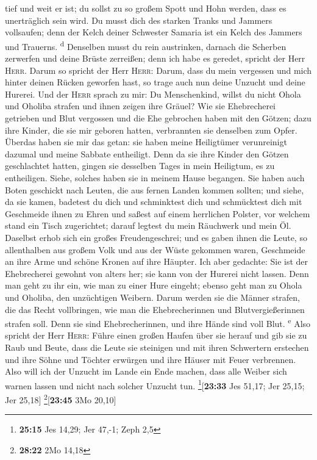 tief und weit er ist; du sollst zu so großem Spott und Hohn werden, dass
es unerträglich sein wird.  Du musst dich des starken
Tranks und Jammers vollsaufen; denn der Kelch deiner Schwester Samaria
ist ein Kelch des Jammers und Trauerns. \textsuperscript{d}
 Denselben musst du rein austrinken, darnach die Scherben
zerwerfen und deine Brüste zerreißen; denn ich habe es geredet, spricht
der Herr \textsc{Herr}.  Darum so spricht der Herr
\textsc{Herr}: Darum, dass du mein vergessen und mich hinter deinen
Rücken geworfen hast, so trage auch nun deine Unzucht und deine Hurerei.
 Und der \textsc{Herr} sprach zu mir: Du Menschenkind,
willst du nicht Ohola und Oholiba strafen und ihnen zeigen ihre Gräuel?
 Wie sie Ehebrecherei getrieben und Blut vergossen und
die Ehe gebrochen haben mit den Götzen; dazu ihre Kinder, die sie mir
geboren hatten, verbrannten sie denselben zum Opfer. 
Überdas haben sie mir das getan: sie haben meine Heiligtümer
verunreinigt dazumal und meine Sabbate entheiligt.  Denn
da sie ihre Kinder den Götzen geschlachtet hatten, gingen sie desselben
Tages in mein Heiligtum, es zu entheiligen. Siehe, solches haben sie in
meinem Hause begangen.  Sie haben auch Boten geschickt
nach Leuten, die aus fernen Landen kommen sollten; und siehe, da sie
kamen, badetest du dich und schminktest dich und schmücktest dich mit
Geschmeide ihnen zu Ehren  und saßest auf einem
herrlichen Polster, vor welchem stand ein Tisch zugerichtet; darauf
legtest du mein Räuchwerk und mein Öl.  Daselbst erhob
sich ein großes Freudengeschrei; und es gaben ihnen die Leute, so
allenthalben aus großem Volk und aus der Wüste gekommen waren,
Geschmeide an ihre Arme und schöne Kronen auf ihre Häupter.
 Ich aber gedachte: Sie ist der Ehebrecherei gewohnt von
alters her; sie kann von der Hurerei nicht lassen.  Denn
man geht zu ihr ein, wie man zu einer Hure eingeht; ebenso geht man zu
Ohola und Oholiba, den unzüchtigen Weibern.  Darum werden
sie die Männer strafen, die das Recht vollbringen, wie man die
Ehebrecherinnen und Blutvergießerinnen strafen soll. Denn sie sind
Ehebrecherinnen, und ihre Hände sind voll Blut. \textsuperscript{e}
 Also spricht der Herr \textsc{Herr}: Führe einen großen
Haufen über sie herauf und gib sie zu Raub und Beute, 
dass die Leute sie steinigen und mit ihren Schwertern erstechen und ihre
Söhne und Töchter erwürgen und ihre Häuser mit Feuer verbrennen.
 Also will ich der Unzucht im Lande ein Ende machen, dass
alle Weiber sich warnen lassen und nicht nach solcher Unzucht tun.
\footnote{\textbf{25:15} Jes 14,29; Jer 47,-1; Zeph 2,5}{[}\textbf{23:33}
Jes 51,17; Jer 25,15; Jer 25,18{]} \footnote{\textbf{28:22} 2Mo 14,18}{[}\textbf{23:45}
3Mo 20,10{]}

